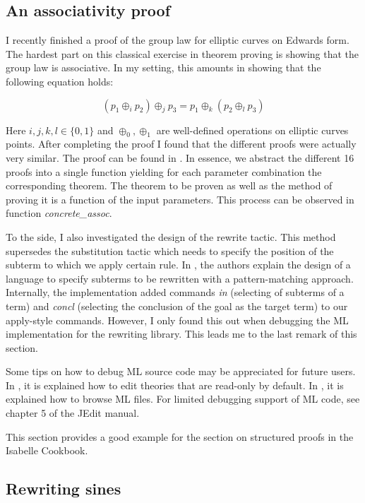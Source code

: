 \documentclass[notitlepage]{article}
\begin{document}
\subsection{An associativity proof}

I recently finished a proof of the group law for elliptic curves on Edwards form. The hardest part on this classical exercise in theorem proving is showing that the group law is associative. In my setting, this amounts in showing that the following equation holds:

\[
(p_1 \oplus_i p_2) \oplus_j p_3 = p_1 \oplus_k (p_2 \oplus_l p_3)
\]

Here $i,j,k,l \in \{0,1\}$ and $\oplus_0,\oplus_1$ are well-defined operations on elliptic curves points. After completing the proof I found that the different proofs were actually very similar. The proof can be found in \cite{associativity}. In essence, we abstract the different 16 proofs into a single function yielding for each parameter combination the corresponding theorem. The theorem to be proven as well as the method of proving it is a function of the input parameters. This process can be observed in function \textit{concrete\_assoc}.

To the side, I also investigated the design of the rewrite tactic. This method supersedes the substitution tactic which needs to specify the position of the subterm to which we apply certain rule. In \cite{noschinskipattern}, the authors explain the design of a language to specify subterms to be rewritten with a pattern-matching approach. Internally, the implementation added commands \textit{in} (selecting of subterms of a term) and \textit{concl} (selecting the conclusion of the goal as the target term) to our apply-style commands. However, I only found this out when debugging the ML implementation for the rewriting library. This leads me to the last remark of this section.

Some tips on how to debug ML source code may be appreciated for future users. In \cite{explore}, it is explained how to edit theories that are read-only by default. In \cite{navigate}, it is explained how to browse ML files. For limited debugging support of ML code, see chapter 5 of the JEdit manual.

This section provides a good example for the section on structured proofs in the Isabelle Cookbook. 

\subsection{Rewriting sines}
\end{document}
